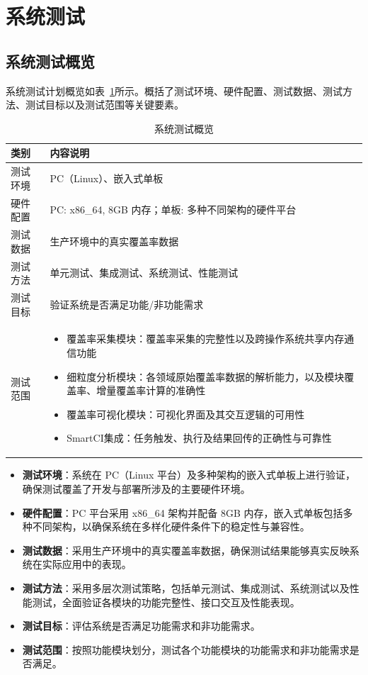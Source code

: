 \section{系统测试}
\subsection{系统测试概览}
系统测试计划概览如表~\ref{tab:6.2}所示。概括了测试环境、硬件配置、测试数据、测试方法、测试目标以及测试范围等关键要素。

\begin{table}[ht]
\centering
\caption{系统测试概览}
\label{tab:6.2}
    \begin{tabular}{lp{10cm}}
        \toprule
        \textbf{类别} & \textbf{内容说明} \\ 
        \midrule
        测试环境 & PC（Linux）、嵌入式单板 \\
        硬件配置 & PC: x86\_64, 8GB 内存；单板: 多种不同架构的硬件平台 \\ 
        测试数据 & 生产环境中的真实覆盖率数据 \\ 
        测试方法 & 单元测试、集成测试、系统测试、性能测试 \\ 
        测试目标 & 验证系统是否满足功能/非功能需求 \\ 
        测试范围 & \begin{itemize}[leftmargin=*]
            \item 覆盖率采集模块：覆盖率采集的完整性以及跨操作系统共享内存通信功能
            \item 细粒度分析模块：各领域原始覆盖率数据的解析能力，以及模块覆盖率、增量覆盖率计算的准确性
            \item 覆盖率可视化模块：可视化界面及其交互逻辑的可用性
            \item SmartCI集成：任务触发、执行及结果回传的正确性与可靠性
        \end{itemize} \\
        \bottomrule
    \end{tabular}
\end{table}

\begin{itemize}
    \item \textbf{测试环境}：系统在 PC（Linux 平台）及多种架构的嵌入式单板上进行验证，确保测试覆盖了开发与部署所涉及的主要硬件环境。
    \item \textbf{硬件配置}：PC 平台采用 x86\_64 架构并配备 8GB 内存，嵌入式单板包括多种不同架构，以确保系统在多样化硬件条件下的稳定性与兼容性。
    \item \textbf{测试数据}：采用生产环境中的真实覆盖率数据，确保测试结果能够真实反映系统在实际应用中的表现。
    \item \textbf{测试方法}：采用多层次测试策略，包括单元测试、集成测试、系统测试以及性能测试，全面验证各模块的功能完整性、接口交互及性能表现。
    \item \textbf{测试目标}：评估系统是否满足功能需求和非功能需求。
    \item \textbf{测试范围}：按照功能模块划分，测试各个功能模块的功能需求和非功能需求是否满足。
\end{itemize}

